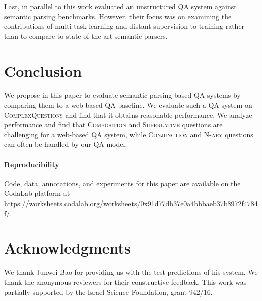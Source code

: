 \documentclass[11pt,a4paper]{article}
\begin{document}
Last, in parallel to this work  evaluated an unstructured QA system against semantic parsing benchmarks. However, their focus was on examining the contributions of multi-task learning and distant supervision to training rather than to compare to state-of-the-art semantic parsers.

\section{Conclusion}
We propose in this paper to evaluate semantic parsing-based QA systems by comparing them to a web-based QA baseline. We evaluate such a QA system on \textsc{ComplexQuestions} and find that it obtains reasonable performance. We analyze performance and find that \textsc{Composition} and \textsc{Superlative} questions are challenging for a web-based QA system, while \textsc{Conjunction} and \textsc{N-ary} questions can often be handled by our QA model. 



\paragraph{Reproducibility}
Code, data, annotations, and experiments
for this paper are available on the CodaLab platform
at \url{https://worksheets.codalab.org/worksheets/0x91d77db37e0a4bbbaeb37b8972f4784f/}.

\section*{Acknowledgments}
We thank Junwei Bao for providing us with the test predictions of his system.
We thank the anonymous reviewers
for their constructive feedback. This
work was partially supported by the Israel Science
Foundation, grant 942/16.



\end{document}
